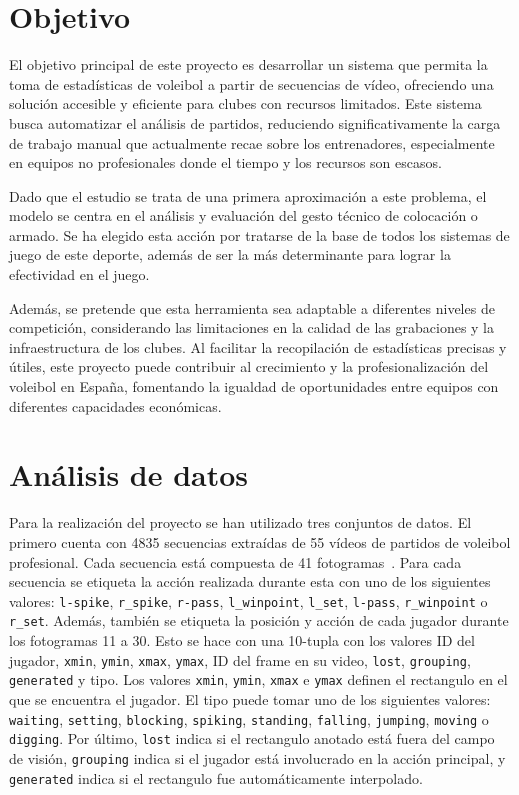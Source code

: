 \documentclass[12pt]{report} %
\begin{document}
    
    \chapter{Objetivo}
    \label{chap:metodos}

    El objetivo principal de este proyecto es desarrollar un sistema que
    permita la toma de estadísticas de voleibol a partir de secuencias de
    vídeo, ofreciendo una solución accesible y eficiente para clubes con
    recursos limitados. Este sistema busca automatizar el análisis de partidos,
    reduciendo significativamente la carga de trabajo manual que actualmente
    recae sobre los entrenadores, especialmente en equipos no profesionales
    donde el tiempo y los recursos son escasos.

    Dado que el estudio se trata de una primera aproximación a este problema,
    el modelo se centra en el análisis y evaluación del gesto técnico de
    colocación o armado. Se ha elegido esta acción por tratarse de la base de
    todos los sistemas de juego de este deporte, además de ser la más
    determinante para lograr la efectividad en el juego.

    Además, se pretende que esta herramienta sea adaptable a diferentes niveles de
    competición, considerando las limitaciones en la calidad de las grabaciones y
    la infraestructura de los clubes. Al facilitar la recopilación de estadísticas
    precisas y útiles, este proyecto puede contribuir al crecimiento y la
    profesionalización del voleibol en España, fomentando la igualdad de
    oportunidades entre equipos con diferentes capacidades económicas.


    \chapter{Análisis de datos}
    \label{cahp:datos}
    Para la realización del proyecto se han utilizado tres conjuntos de datos.
    El primero cuenta con 4835 secuencias extraídas de 55 vídeos
    de partidos de voleibol profesional. Cada secuencia está compuesta de 41
    fotogramas~\cite{dataset1}. 
    Para cada secuencia se etiqueta la acción realizada durante
    esta con uno de los siguientes valores: \verb!l-spike!,
    \verb!r_spike!, \verb!r-pass!, \verb!l_winpoint!, \verb!l_set!,
    \verb!l-pass!, \verb!r_winpoint! o \verb!r_set!. Además, también se etiqueta
    la posición y acción de cada jugador durante los fotogramas 11 a 30. Esto se
    hace con una 10-tupla con los valores ID del jugador, \verb!xmin!,
    \verb!ymin!, \verb!xmax!, \verb!ymax!, ID del frame en su video,
    \verb!lost!, \verb!grouping!, \verb!generated! y tipo. Los valores \verb!xmin!,
    \verb!ymin!, \verb!xmax! e \verb!ymax! definen el rectangulo en el que se
    encuentra el jugador. El tipo puede tomar uno de los siguientes valores:
    \verb!waiting!, \verb!setting!, \verb!blocking!, \verb!spiking!,
    \verb!standing!, \verb!falling!, \verb!jumping!, \verb!moving! o
    \verb!digging!. Por último, \verb!lost! indica si el rectangulo anotado está
    fuera del campo de visión, \verb!grouping! indica si el jugador está
    involucrado en la acción principal, y \verb!generated! indica si el
    rectangulo fue automáticamente interpolado.
\end{document}
